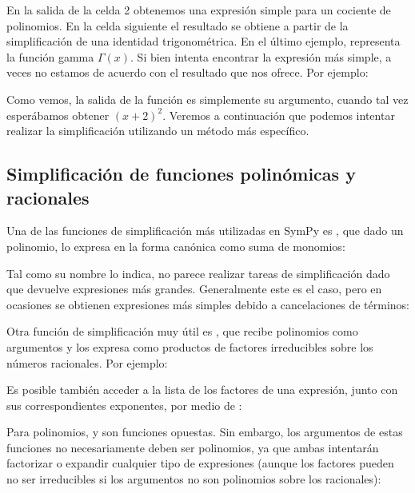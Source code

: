 
En la salida de la celda 2 obtenemos una expresión simple para un cociente de polinomios. En la celda siguiente el resultado se obtiene a partir de la simplificación de una identidad trigonométrica. En el último ejemplo,  representa la función gamma $\Gamma(x)$. Si bien  intenta encontrar la expresión más simple, a veces no estamos de acuerdo con el resultado que nos ofrece. Por ejemplo: 


Como vemos, la salida de la función es simplemente su argumento, cuando tal vez esperábamos obtener $(x + 2)^2$. Veremos a continuación que podemos intentar realizar la simplificación utilizando un método más específico.  

\subsection{Simplificación de funciones polinómicas y racionales}
Una de las funciones de simplificación más utilizadas en SymPy es , que dado un polinomio, lo expresa en la forma canónica como suma de monomios:


Tal como su nombre lo indica,  no parece realizar tareas de simplificación dado que devuelve expresiones más grandes. Generalmente este es el caso, pero en ocasiones se obtienen expresiones más simples debido a cancelaciones de términos:


Otra función de simplificación muy útil es , que recibe polinomios como argumentos y los expresa como productos de factores irreducibles sobre los números racionales. Por ejemplo:


Es posible también acceder a la lista de los factores de una expresión, junto con sus correspondientes exponentes, por medio de :


Para polinomios,  y  son funciones opuestas. Sin embargo, los argumentos de estas funciones no necesariamente deben ser polinomios, ya que ambas intentarán factorizar o expandir cualquier tipo de expresiones (aunque los factores pueden no ser irreducibles si los argumentos no son polinomios sobre los racionales):

